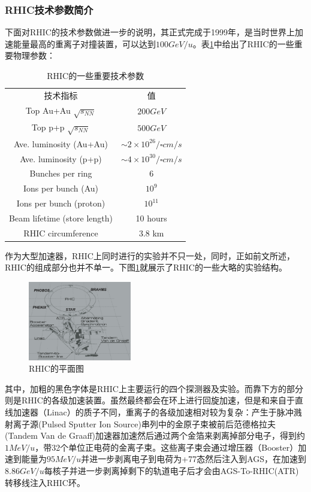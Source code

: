 \documentclass[%
 reprint,
 amsmath,amssymb,
 aps,
]{revtex4-1}
\begin{document}
\subsubsection{\label{sec:RHICSpec}RHIC技术参数简介}
下面对RHIC的技术参数做进一步的说明，其正式完成于1999年，是当时世界上加速能量最高的重离子对撞装置，可以达到$100\si{GeV/u}$。表\ref{tab:RhicSpec}中给出了RHIC的一些重要物理参数\cite{Ruan:2005hy}\cite{Dong:2005iq}：
\begin{table}[htbp]
    \centering
    \caption{\label{tab:RhicSpec}RHIC的一些重要技术参数}
    \begin{ruledtabular}
    \begin{tabular}{cc}
    技术指标&值  \\
    \colrule
    Top Au+Au $\sqrt{s_{NN}}$&$200 \si{GeV}$ \\
    Top p+p $\sqrt{s_{NN}}$&$500 \si{GeV}$ \\
    Ave. luminosity (Au+Au) & $\sim 2\times10^{26}\si{\per \square cm \per s}$ \\
    Ave. luminosity (p+p) & $\sim 4\times10^{30}\si{\per \square cm \per s}$ \\ 
    Bunches per ring & 6 \\
    Ions per bunch (Au) & $10^9$ \\
    Ions per bunch (proton) & $10^{11}$ \\
    Beam lifetime (store length) & 10 hours\\
    RHIC circumference & 3.8 km
    \end{tabular}
    \end{ruledtabular}
\end{table}

作为大型加速器，RHIC上同时进行的实验并不只一处，同时，正如前文所述，RHIC的组成部分也并不单一。下图\ref{fig:RHIC}就展示了RHIC的一些大略的实验结构。
\begin{figure}[htbp]
    \includegraphics[width=0.4\textwidth]{Plots/RHIC.png}
    \caption{\label{fig:RHIC}RHIC的平面图}
\end{figure}
其中，加粗的黑色字体是RHIC上主要运行的四个探测器及实验。而靠下方的部分则是RHIC的各级加速装置。虽然最终都会在环上进行回旋加速，但是和来自于直线加速器（Linac）的质子不同，重离子的各级加速相对较为复杂：产生于脉冲溅射离子源(Pulsed Sputter Ion Source)串列中的金原子束被前后范德格拉夫(Tandem Van de Graaff)加速器加速然后通过两个金箔来剥离掉部分电子，得到约$1\si{MeV/u}$，带32个单位正电荷的金离子束。这些离子束会通过增压器（Booster）加速到能量为$95\si{MeV/u}$并进一步剥离电子到电荷为+77态然后注入到AGS，在加速到$8.86\si{GeV/u}$每核子并进一步剥离掉剩下的轨道电子后才会由AGS-To-RHIC(ATR)转移线注入RHIC环。
\end{document}
